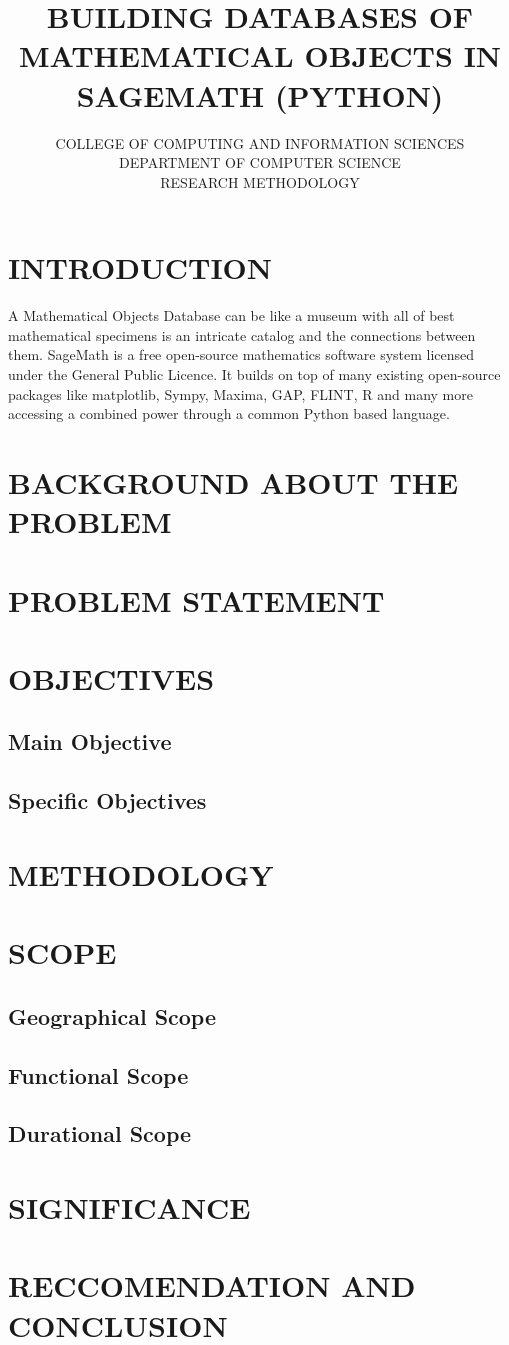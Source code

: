 \documentclass[11pt]{report}
\title{\textbf{BUILDING DATABASES OF MATHEMATICAL OBJECTS IN SAGEMATH (PYTHON)}}
\author{COLLEGE OF COMPUTING AND INFORMATION SCIENCES\\DEPARTMENT OF COMPUTER SCIENCE\\RESEARCH METHODOLOGY}
\begin{document}
\maketitle

\section{INTRODUCTION}
A Mathematical Objects Database can be like a museum with all of best mathematical specimens is an intricate catalog and the connections between them. SageMath is a free open-source mathematics software system licensed under the General Public Licence. It builds on top of many existing open-source packages like matplotlib, Sympy, Maxima, GAP, FLINT, R and many more accessing a combined power through a common Python based language.

\section{BACKGROUND ABOUT THE PROBLEM}

\section{PROBLEM STATEMENT}

\section{OBJECTIVES}
\subsection{Main Objective}


\subsection{Specific Objectives}


\section{METHODOLOGY}

\section{SCOPE}
\subsection{Geographical Scope}


\subsection{Functional Scope}


\subsection{Durational Scope}


\section{SIGNIFICANCE}


\section{RECCOMENDATION AND CONCLUSION}
\end{document}
